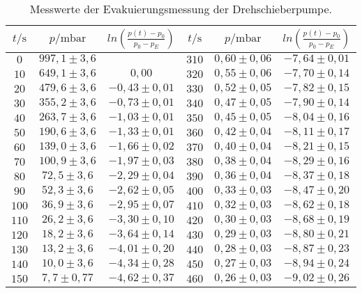 \begin{table}[H]
  \centering
  \caption{Messwerte der Evakuierungsmessung der Drehschieberpumpe.}
  \label{tab:drehevak}
  \begin{tabular}{c c c | c c c}
    \toprule
    $t/\si{\second}$ & $p/\si{\milli\bar}$ & $ln(\frac{p(t)-p_0}{p_0 - p_E})$ & $t/\si{\second}$ & $p/\si{\milli\bar}$ & $ln(\frac{p(t)-p_0}{p_0 - p_E})$\\ 
    \midrule
    $  0$ & $997,1 \pm  3,6$  &                  & $310$ & $ 0,60 \pm 0,06 $ & $ -7,64 \pm 0,01$ \\ 
    $ 10$ & $649,1 \pm  3,6$  & $ 0,00         $ & $320$ & $ 0,55 \pm 0,06 $ & $ -7,70 \pm 0,14$ \\
    $ 20$ & $479,6 \pm  3,6$  & $-0,43 \pm 0,01$ & $330$ & $ 0,52 \pm 0,05 $ & $ -7,82 \pm 0,15$ \\
    $ 30$ & $355,2 \pm  3,6$  & $-0,73 \pm 0,01$ & $340$ & $ 0,47 \pm 0,05 $ & $ -7,90 \pm 0,14$ \\
    $ 40$ & $263,7 \pm  3,6$  & $-1,03 \pm 0,01$ & $350$ & $ 0,45 \pm 0,05 $ & $ -8,04 \pm 0,16$ \\
    $ 50$ & $190,6 \pm  3,6$  & $-1,33 \pm 0,01$ & $360$ & $ 0,42 \pm 0,04 $ & $ -8,11 \pm 0,17$ \\
    $ 60$ & $139,0 \pm  3,6$  & $-1,66 \pm 0,02$ & $370$ & $ 0,40 \pm 0,04 $ & $ -8,21 \pm 0,15$ \\
    $ 70$ & $100,9 \pm  3,6$  & $-1,97 \pm 0,03$ & $380$ & $ 0,38 \pm 0,04 $ & $ -8,29 \pm 0,16$ \\
    $ 80$ & $ 72,5 \pm  3,6$  & $-2,29 \pm 0,04$ & $390$ & $ 0,36 \pm 0,04 $ & $ -8,37 \pm 0,18$ \\
    $ 90$ & $ 52,3 \pm  3,6$  & $-2,62 \pm 0,05$ & $400$ & $ 0,33 \pm 0,03 $ & $ -8,47 \pm 0,20$ \\
    $100$ & $ 36,9 \pm  3,6$  & $-2,95 \pm 0,07$ & $410$ & $ 0,32 \pm 0,03 $ & $ -8,62 \pm 0,18$ \\
    $110$ & $ 26,2 \pm  3,6$  & $-3,30 \pm 0,10$ & $420$ & $ 0,30 \pm 0,03 $ & $ -8,68 \pm 0,19$ \\
    $120$ & $ 18,2 \pm  3,6$  & $-3,64 \pm 0,14$ & $430$ & $ 0,29 \pm 0,03 $ & $ -8,80 \pm 0,21$ \\
    $130$ & $ 13,2 \pm  3,6$  & $-4,01 \pm 0,20$ & $440$ & $ 0,28 \pm 0,03 $ & $ -8,87 \pm 0,23$ \\
    $140$ & $ 10,0 \pm  3,6$  & $-4,34 \pm 0,28$ & $450$ & $ 0,27 \pm 0,03 $ & $ -8,94 \pm 0,24$ \\
    $150$ & $  7,7 \pm 0,77$  & $-4,62 \pm 0,37$ & $460$ & $ 0,26 \pm 0,03 $ & $ -9,02 \pm 0,26$ \\

\end{tabular}
\end{table}
